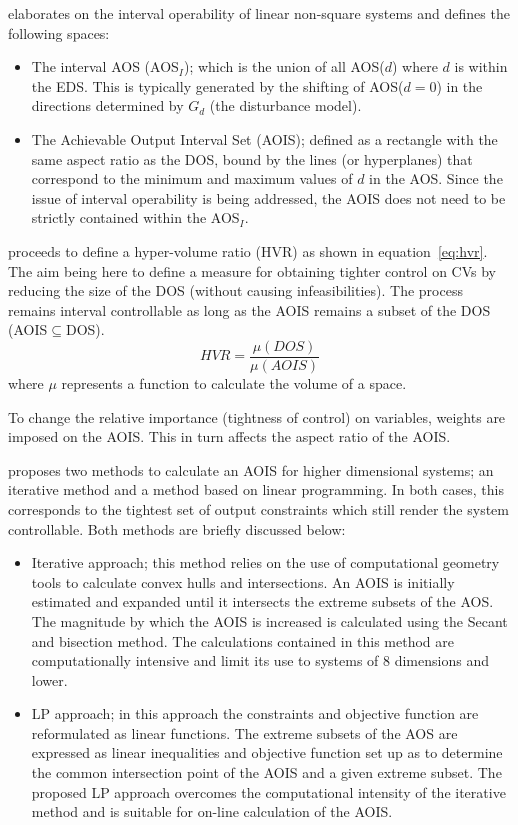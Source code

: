 \citet{limaphd} elaborates on the interval operability of linear non-square systems and defines the following spaces:
\begin{itemize}
  \item The interval AOS (AOS$_I$); which is the union of all AOS($d$) where $d$ is within the EDS. 
This is typically generated by the shifting of AOS($d=0$) in the directions determined by $G_d$ (the disturbance model).
  \item The Achievable Output Interval Set (AOIS); defined as a rectangle with the same aspect ratio as the DOS, bound by the lines (or hyperplanes) that correspond to the minimum and maximum values of $d$ in the AOS. 
Since the issue of interval operability is being addressed, the AOIS does not need to be strictly contained within the AOS$_I$.
\end{itemize}
\citet{limaphd} proceeds to define a hyper-volume ratio (HVR) as shown in equation~\ref{eq:hvr}. 
The aim being here to define a measure for obtaining tighter control on CVs by reducing the size of the DOS (without causing infeasibilities). 
The process remains interval controllable as long as the AOIS remains a subset of the DOS (AOIS$\subseteq$DOS).
\begin{equation}
  \label{eq:hvr}
    HVR = \frac{\mu(DOS)}{\mu(AOIS)}
\end{equation}
where $\mu$ represents a function to calculate the volume of a space.

To change the relative importance (tightness of control) on variables, weights are imposed on the AOIS. 
This in turn affects the aspect ratio of the AOIS.

\citet{limaphd} proposes two methods to calculate an AOIS for higher dimensional systems; an iterative method and a method based on linear programming. 
In both cases, this corresponds to the tightest set of output constraints which still render the system controllable. 
Both methods are briefly discussed below:
\begin{itemize}
  \item Iterative approach; this method relies on the use of computational geometry tools to calculate convex hulls and intersections. 
An AOIS is initially estimated and expanded until it intersects the extreme subsets of the AOS. 
The magnitude by which the AOIS is increased is calculated using the Secant and bisection method. 
The calculations contained in this method are computationally intensive and limit its use to systems of 8 dimensions and lower.
  \item LP approach; in this approach the constraints and objective function are reformulated as linear functions. 
The extreme subsets of the AOS are expressed as linear inequalities and objective function set up as to determine the common intersection point of the AOIS and a given extreme subset. 
The proposed LP approach overcomes the computational intensity of the iterative method and is suitable for on-line calculation of the AOIS.
\end{itemize}

